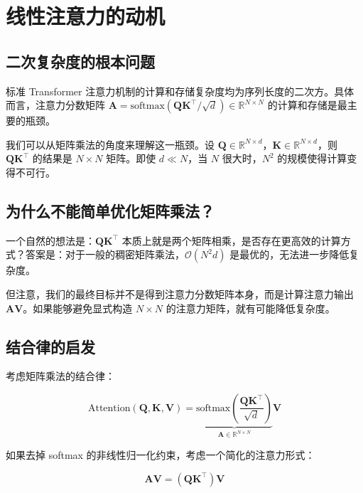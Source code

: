 \chapter{线性注意力的动机}

\section{二次复杂度的根本问题}

标准 Transformer 注意力机制的计算和存储复杂度均为序列长度的二次方。具体而言，注意力分数矩阵 $\mathbf{A} = \text{softmax}(\mathbf{Q}\mathbf{K}^\top / \sqrt{d}) \in \mathbb{R}^{N \times N}$ 的计算和存储是最主要的瓶颈。

我们可以从矩阵乘法的角度来理解这一瓶颈。设 $\mathbf{Q} \in \mathbb{R}^{N \times d}$，$\mathbf{K} \in \mathbb{R}^{N \times d}$，则 $\mathbf{Q}\mathbf{K}^\top$ 的结果是 $N \times N$ 矩阵。即使 $d \ll N$，当 $N$ 很大时，$N^2$ 的规模使得计算变得不可行。

\section{为什么不能简单优化矩阵乘法？}

一个自然的想法是：$\mathbf{Q}\mathbf{K}^\top$ 本质上就是两个矩阵相乘，是否存在更高效的计算方式？答案是：对于一般的稠密矩阵乘法，$\mathcal{O}(N^2 d)$ 是最优的，无法进一步降低复杂度。

但注意，我们的最终目标并不是得到注意力分数矩阵本身，而是计算注意力输出 $\mathbf{A}\mathbf{V}$。如果能够避免显式构造 $N \times N$ 的注意力矩阵，就有可能降低复杂度。

\section{结合律的启发}

考虑矩阵乘法的结合律：

\begin{equation}
    \text{Attention}(\mathbf{Q}, \mathbf{K}, \mathbf{V}) = \underbrace{\text{softmax}\left(\frac{\mathbf{Q}\mathbf{K}^\top}{\sqrt{d}}\right)}_{\mathbf{A} \in \mathbb{R}^{N \times N}}\mathbf{V}
\end{equation}

如果去掉 softmax 的非线性归一化约束，考虑一个简化的注意力形式：

\begin{equation}
    \mathbf{A}\mathbf{V} = (\mathbf{Q}\mathbf{K}^\top)\mathbf{V}
\end{equation}


